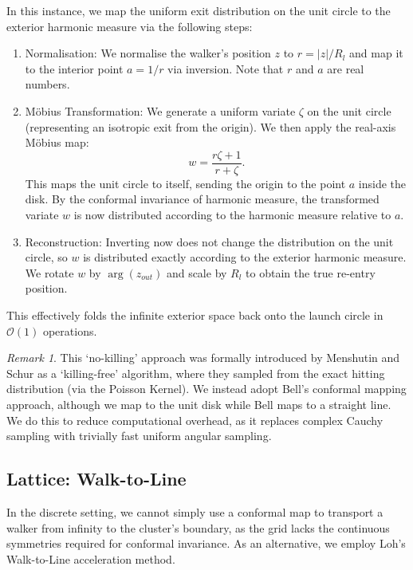 \documentclass[12pt, a4paper, oneside]{report}
\theoremstyle{remark}
\newtheorem{remark}[theorem]{Remark}
\begin{document}
In this instance, we map the uniform exit distribution on the unit circle to the exterior harmonic measure via the following steps:
 \begin{enumerate}
    \item Normalisation: We normalise the walker's position $z$ to $r = |z|/R_l$ and map it to the interior point $a = 1/r$ via inversion. Note that $r$ and $a$ are real numbers.
    \item Möbius Transformation: We generate a uniform variate $\zeta$ on the unit circle (representing an isotropic exit from the origin). We then apply the real-axis Möbius map:
    \begin{equation*}
        w = \frac{r\zeta + 1}{r + \zeta}.
    \end{equation*}
    This maps the unit circle to itself, sending the origin to the point $a$ inside the disk. By the conformal invariance of harmonic measure, the transformed variate $w$ is now distributed according to the harmonic measure relative to $a$.
    \item Reconstruction: Inverting now does not change the distribution on the unit circle, so $w$ is distributed exactly according to the exterior harmonic measure. We rotate $w$ by $\arg(z_{out})$ and scale by $R_l$ to obtain the true re-entry position.
\end{enumerate}
This effectively folds the infinite exterior space back onto the launch circle in $\mathcal{O}(1)$ operations. 

\begin{remark}
This `no-killing' approach was formally introduced by Menshutin and Schur \cite{menshutin2006} as a `killing-free' algorithm, where they sampled from the exact hitting distribution (via the Poisson Kernel). We instead adopt Bell's conformal mapping approach, although we map to the unit disk while Bell maps to a straight line. We do this to reduce computational overhead, as it replaces complex Cauchy sampling with trivially fast uniform angular sampling.
\end{remark}

\subsection{Lattice: Walk-to-Line}
\label{sec:lattice_wtl}

In the discrete setting, we cannot simply use a conformal map to transport a walker from infinity to the cluster's boundary, as the grid lacks the continuous symmetries required for conformal invariance. As an alternative, we employ Loh's Walk-to-Line acceleration method.
\end{document}
